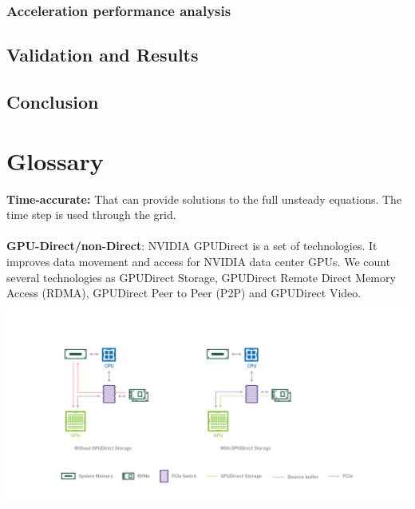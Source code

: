 \documentclass[10pt,a4paper]{article}
\begin{document}
\subsubsection{Acceleration performance analysis}

\subsection{Validation and Results}

\subsection{Conclusion}


\newpage
\section{Glossary}
\textbf{Time-accurate:} That can provide solutions to the full unsteady equations. The time step is used through the grid.\\
\vspace{0.2cm}\\
\textbf{GPU-Direct/non-Direct}: NVIDIA GPUDirect  is a set of technologies. It improves data movement and access for NVIDIA data center GPUs. We count several technologies as GPUDirect Storage, GPUDirect Remote Direct Memory Access (RDMA), GPUDirect Peer to Peer (P2P) and GPUDirect Video.\\
\includegraphics[scale=0.4]{GPUDirect.png}
\end{document}
